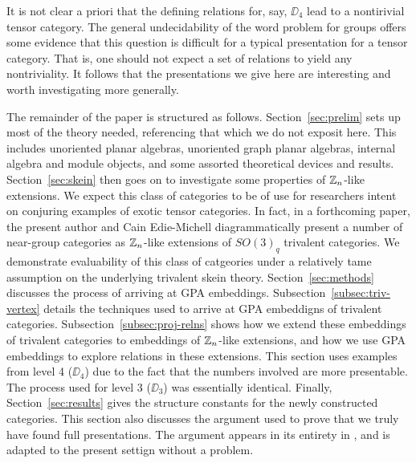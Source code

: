 It is not clear a priori that the defining relations for, say, $\DD_4$ lead to a nontirivial tensor category.
The general undecidability of the word problem for groups offers some evidence that this question is difficult
for a typical presentation for a tensor category.
That is, one should not expect a set of relations to yield any nontriviality.
It follows that the presentations we give here are interesting and worth investigating more generally.

The remainder of the paper is structured as follows.
Section~\ref{sec:prelim} sets up most of the theory needed, referencing that which we do not exposit here.
This includes unoriented planar algebras, unoriented graph planar algebras, 
internal algebra and module objects, and some assorted theoretical devices and results.
Section~\ref{sec:skein} then goes on to investigate some properties of $\mathbb{Z}_n$-like extensions.
We expect this class of categories to be of use for researchers intent on conjuring 
examples of exotic tensor categories.
In fact, in a forthcoming paper, the present author and Cain Edie-Michell diagrammatically
present a number of near-group categories as $\mathbb{Z}_n$-like extensions of $SO(3)_q$ trivalent categories.
We demonstrate evaluability of this class of catgeories under a relatively tame assumption on the
underlying trivalent skein theory.
Section~\ref{sec:methods} discusses the process of arriving at GPA embeddings.
Subsection~\ref{subsec:triv-vertex} details the techniques used to arrive at GPA embeddigns of 
trivalent categories. 
Subsection~\ref{subsec:proj-relns} shows how we extend these embeddings of trivalent categories
to embeddings of $\mathbb{Z}_n$-like extensions, and how we use GPA embeddings to explore 
relations in these extensions.
This section uses examples from level 4 ($\DD_4$) due to the fact that the numbers involved are more presentable.
The process used for level 3 ($\DD_3$) was essentially identical.
Finally, Section~\ref{sec:results} gives the structure constants for the newly constructed categories.
This section also discusses the argument used to prove that we truly have found full presentations.
The argument appears in its entirety in \cite{cain_noah}, and is adapted to the present settign without a problem.